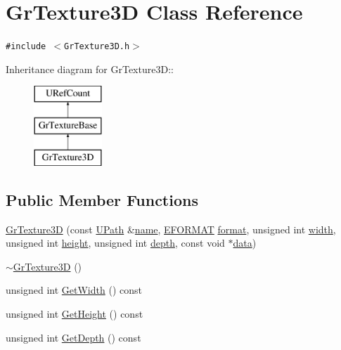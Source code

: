 \hypertarget{class_gr_texture3_d}{
\section{GrTexture3D Class Reference}
\label{class_gr_texture3_d}
}
{\tt \#include $<$GrTexture3D.h$>$}

Inheritance diagram for GrTexture3D::\begin{figure}[H]
\begin{center}
\leavevmode
\includegraphics[height=3cm]{class_gr_texture3_d}
\end{center}
\end{figure}
\subsection*{Public Member Functions}
\begin{CompactItemize}
\item 
\hyperlink{class_gr_texture3_d_c3611bc956309cc465c8c03433e72286}{GrTexture3D} (const \hyperlink{class_u_path}{UPath} \&\hyperlink{glext__bak_8h_bb62efe59ccdd153ce42e1a418352209}{name}, \hyperlink{class_gr_texture_base_82c606022e93566ba55fe4cd3beb687c}{EFORMAT} \hyperlink{glext__bak_8h_e2d3db041c6004a67047659b42f73a44}{format}, unsigned int \hyperlink{wglext_8h_e6531b1788ca42a9ae8155b0c52e7630}{width}, unsigned int \hyperlink{wglext_8h_b2e63df950c3789599e1e43f477bc9e3}{height}, unsigned int \hyperlink{glext__bak_8h_1c814629538debe12a7bfe2509a3671e}{depth}, const void $\ast$\hyperlink{glext__bak_8h_69926c009f2d52c6b6d2c76784af8c64}{data})
\item 
\hyperlink{class_gr_texture3_d_9a050242b03ed0a5964bb65dbcaef192}{$\sim$GrTexture3D} ()
\item 
unsigned int \hyperlink{class_gr_texture3_d_e8d6fe931d4ff64e7e8de9274c647ea5}{GetWidth} () const 
\item 
unsigned int \hyperlink{class_gr_texture3_d_0950cc460af54502140d7fb34c04f3a7}{GetHeight} () const 
\item 
unsigned int \hyperlink{class_gr_texture3_d_cca9d3ad504ee989804be666689e55d2}{GetDepth} () const 
\end{CompactItemize}


